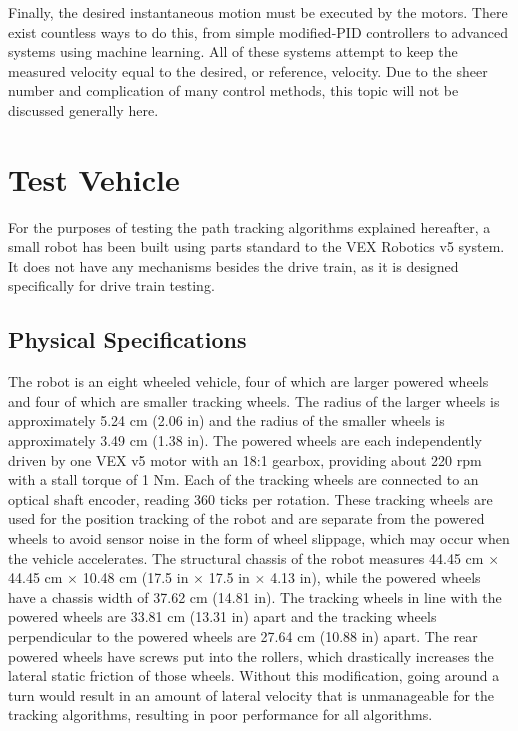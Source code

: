 \documentclass[mla7]{mla}
\begin{document}
\begin{paper}
Finally, the desired instantaneous motion must be executed by the motors. There exist countless ways to do this, from simple modified-PID controllers to advanced systems using machine learning. All of these systems attempt to keep the measured velocity equal to the desired, or reference, velocity. Due to the sheer number and complication of many control methods, this topic will not be discussed generally here.

\section{Test Vehicle}

For the purposes of testing the path tracking algorithms explained hereafter, a small robot has been built using parts standard to the VEX Robotics v5 system. It does not have any mechanisms besides the drive train, as it is designed specifically for drive train testing.

\subsection{Physical Specifications}

The robot is an eight wheeled vehicle, four of which are larger powered wheels and four of which are smaller tracking wheels. The radius of the larger wheels is approximately 5.24 cm (2.06 in) and the radius of the smaller wheels is approximately 3.49 cm (1.38 in). The powered wheels are each independently driven by one VEX v5 motor with an 18:1 gearbox, providing about 220 rpm with a stall torque of 1 Nm. Each of the tracking wheels are connected to an optical shaft encoder, reading 360 ticks per rotation. These tracking wheels are used for the position tracking of the robot and are separate from the powered wheels to avoid sensor noise in the form of wheel slippage, which may occur when the vehicle accelerates. The structural chassis of the robot measures 44.45 cm $\times$ 44.45 cm $\times$ 10.48 cm (17.5 in $\times$ 17.5 in $\times$ 4.13 in), while the powered wheels have a chassis width of 37.62 cm (14.81 in). The tracking wheels in line with the powered wheels are 33.81 cm (13.31 in) apart and the tracking wheels perpendicular to the powered wheels are 27.64 cm (10.88 in) apart. The rear powered wheels have screws put into the rollers, which drastically increases the lateral static friction of those wheels. Without this modification, going around a turn would result in an amount of lateral velocity that is unmanageable for the tracking algorithms, resulting in poor performance for all algorithms. 


\end{paper}
\end{document}
